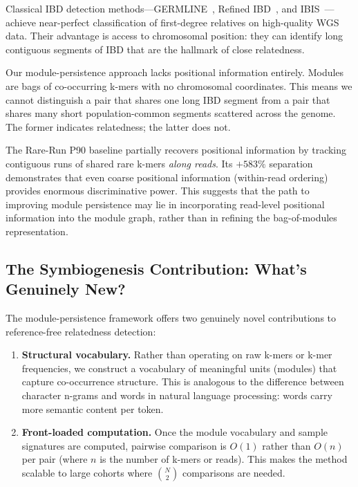 \documentclass{../yalumba}
\begin{document}
Classical IBD detection methods---GERMLINE~\cite{gusev2009germline},
Refined IBD~\cite{browning2013refinedibd}, and IBIS~\cite{browning2020ibis}---achieve
near-perfect classification of first-degree relatives on high-quality WGS data.
Their advantage is access to chromosomal position: they can identify long
contiguous segments of IBD that are the hallmark of close relatedness.

Our module-persistence approach lacks positional information entirely.  Modules
are bags of co-occurring k-mers with no chromosomal coordinates.  This means
we cannot distinguish a pair that shares one long IBD segment from a pair that
shares many short population-common segments scattered across the genome.  The
former indicates relatedness; the latter does not.

The Rare-Run P90 baseline partially recovers positional information by tracking
contiguous runs of shared rare k-mers \emph{along reads}.  Its $+583\%$
separation demonstrates that even coarse positional information (within-read
ordering) provides enormous discriminative power.  This suggests that the path
to improving module persistence may lie in incorporating read-level positional
information into the module graph, rather than in refining the bag-of-modules
representation.

\subsection{The Symbiogenesis Contribution: What's Genuinely New?}

The module-persistence framework offers two genuinely novel contributions to
reference-free relatedness detection:

\begin{enumerate}
  \item \textbf{Structural vocabulary.}  Rather than operating on raw k-mers
        or k-mer frequencies, we construct a vocabulary of meaningful units
        (modules) that capture co-occurrence structure.  This is analogous to
        the difference between character n-grams and words in natural language
        processing: words carry more semantic content per token.

  \item \textbf{Front-loaded computation.}  Once the module vocabulary and
        sample signatures are computed, pairwise comparison is $O(1)$ rather
        than $O(n)$ per pair (where $n$ is the number of k-mers or reads).
        This makes the method scalable to large cohorts where $\binom{N}{2}$
        comparisons are needed.
\end{enumerate}
\end{document}
